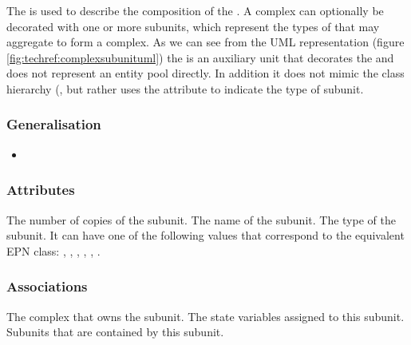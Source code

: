 \label{defn:Subunit}\label{sec:techref:subunits}

The  is used to describe the composition of the
. A complex can optionally be decorated with one or
more subunits, which represent the types of 
that may aggregate to form a complex. As we can see from the UML
representation (figure \ref{fig:techref:complexsubunituml}) the
 is an auxiliary unit that decorates the
 and does not represent an entity pool directly. In
addition it does not mimic the  class
hierarchy (, but rather uses the
 attribute to indicate the type of subunit.

\subsubsection{Generalisation}

\begin{itemize}
\item {}
\end{itemize}

\subsubsection{Attributes}

\begin{attributes}
   The number of copies of the subunit.
   The name of the subunit.
   The type of the subunit. It can have
  one of the following values that correspond to the equivalent EPN
  class: , ,
  , ,
  , .
\end{attributes}

\subsubsection{Associations}

\begin{attributes}
   The complex that owns the subunit.
   The state variables assigned
  to this subunit.
   Subunits that are contained by this subunit.
\end{attributes}

